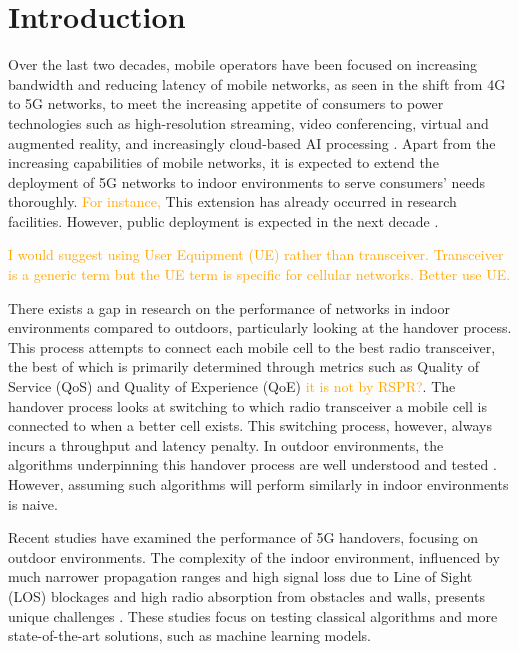 \chapter{Introduction}

Over the last two decades, mobile operators have been focused on increasing bandwidth and reducing latency of mobile networks, as seen in the shift from 4G to 5G networks, to meet the increasing appetite of consumers to power technologies such as high-resolution streaming, video conferencing, virtual and augmented reality, and increasingly cloud-based AI processing \cite{cisco_cisco_2023}. Apart from the increasing capabilities of mobile networks, it is expected to extend the deployment of 5G networks to indoor environments to serve consumers' needs thoroughly. \textcolor{orange}{For instance, }This extension has already occurred in research facilities. However, public deployment is expected in the next decade \cite{zander_beyond_2016}.

\textcolor{orange}{I would suggest using User Equipment (UE) rather than transceiver. Transceiver is a generic term but the UE term is specific for cellular networks. Better use UE.}

There exists a gap in research on the performance of networks in indoor environments compared to outdoors, particularly looking at the handover process. This process attempts to connect each mobile cell to the best radio transceiver, the best of which is primarily determined through metrics such as Quality of Service (QoS) and Quality of Experience (QoE) \textcolor{orange}{it is not by RSPR?}. The handover process looks at switching to which radio transceiver a mobile cell is connected to when a better cell exists. This switching process, however, always incurs a throughput and latency penalty. In outdoor environments, the algorithms underpinning this handover process are well understood and tested \cite{mollel_survey_2021}. However, assuming such algorithms will perform similarly in indoor environments is naive.

Recent studies have examined the performance of 5G handovers, focusing on outdoor environments. The complexity of the indoor environment, influenced by much narrower propagation ranges and high signal loss due to Line of Sight (LOS) blockages and high radio absorption from obstacles and walls, presents unique challenges \cite{niknam_interference_2018}. These studies focus on testing classical algorithms and more state-of-the-art solutions, such as machine learning models. \cite{mollel_survey_2021}

